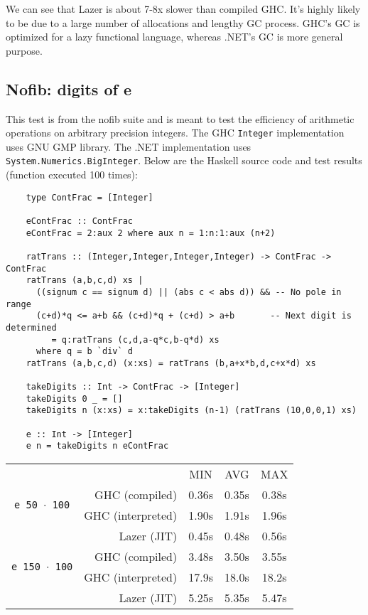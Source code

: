 \documentclass[en]{pracamgr}
\begin{document}
We can see that Lazer is about 7-8x slower than compiled GHC.
It's highly likely to be due to a large number of allocations
and lengthy GC process. GHC's GC is optimized for a lazy
functional language, whereas .NET's GC is more general purpose.

\subsection{Nofib: digits of e}

This test is from the nofib suite and is meant to test
the efficiency of arithmetic operations 
on arbitrary precision integers.
The GHC \texttt{Integer} implementation uses GNU GMP
library. The .NET implementation uses \texttt{System.Numerics.BigInteger}.
Below are the Haskell source code and test results (function executed 100 times):

\begin{verbatim}
    type ContFrac = [Integer]

    eContFrac :: ContFrac
    eContFrac = 2:aux 2 where aux n = 1:n:1:aux (n+2)
    
    ratTrans :: (Integer,Integer,Integer,Integer) -> ContFrac -> ContFrac
    ratTrans (a,b,c,d) xs |
      ((signum c == signum d) || (abs c < abs d)) && -- No pole in range
      (c+d)*q <= a+b && (c+d)*q + (c+d) > a+b       -- Next digit is determined
         = q:ratTrans (c,d,a-q*c,b-q*d) xs
      where q = b `div` d
    ratTrans (a,b,c,d) (x:xs) = ratTrans (b,a+x*b,d,c+x*d) xs
    
    takeDigits :: Int -> ContFrac -> [Integer]
    takeDigits 0 _ = []
    takeDigits n (x:xs) = x:takeDigits (n-1) (ratTrans (10,0,0,1) xs)
    
    e :: Int -> [Integer]
    e n = takeDigits n eContFrac
\end{verbatim}

\begin{center}
\begin{tabular}{c r c c c}
    & & MIN & AVG & MAX \\
    \cline{3-5}

    \multirow{2}{*}{\texttt{e 50 $\cdot$ 100}}
    & GHC (compiled)& 0.36s & 0.35s & 0.38s \\
    & GHC (interpreted)& 1.90s & 1.91s & 1.96s \\
    & Lazer (JIT)& 0.45s & 0.48s & 0.56s \\
    \cline{2-5}

    \multirow{2}{*}{\texttt{e 150 $\cdot$ 100}}
    & GHC (compiled)& 3.48s & 3.50s & 3.55s \\
    & GHC (interpreted)& 17.9s & 18.0s & 18.2s \\
    & Lazer (JIT)& 5.25s & 5.35s & 5.47s \\
\end{tabular}
\end{center}
\end{document}
